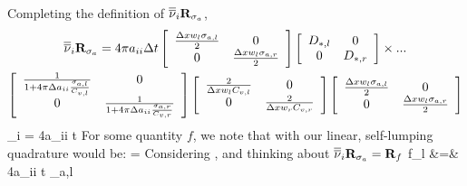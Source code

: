\eeanum
Completing the definition of $\overline{\overline{\nu}}_i \mathbf{R}_{\sigma_a}$,
\begin{multline}
\overline{\overline{\nu}}_i \mathbf{R}_{\sigma_a} = 4\pi a_{ii} \Delta t 
\left[  \begin{array}{cc} \frac{\Delta x w_l \sigma_{a,l} }{2}  & 0 \\ 0 & \frac{\Delta x w_l \sigma_{a,r} }{2}  \end{array} \right] 
\left[  \begin{array}{cc} D_{*,l} & 0 \\ 0 & D_{*,r} \end{array} \right] \times ... \\
\left[ \begin{array}{cc} \frac{1}{1 + 4\pi \Delta a_{ii} \frac{\sigma_{a,l}}{C_{v,l}}}& 0 \\ 0 &   \frac{1}{1 + 4\pi \Delta a_{ii} \frac{\sigma_{a,r}}{C_{v,r}}} \end{array} \right]
\left[ \begin{array}{cc} \frac{2}{\Delta x w_l C_{v,l} }& 0 \\ 0 & \frac{2}{\Delta x w_r C_{v,r} } \end{array} \right]
\left[  \begin{array}{cc} \frac{\Delta x w_l \sigma_{a,l} }{2}  & 0 \\ 0 & \frac{\Delta x w_l \sigma_{a,r} }{2}  \end{array} \right] 
\end{multline}
\benum
\overline{\overline{\nu}}_i  = 4\pi a_{ii} \Delta t 
\label{eq:almost_to_f}
\eenum
For some quantity $f$, we note that  with our linear, self-lumping quadrature would be:
\benum
{} =  \pep
\eenum
Considering , and thinking about $\overline{\overline{\nu}}_i \mathbf{R}_{\sigma_a} = \mathbf{R}_{f}$
\beanum
f_l &=& 4\pi a_{ii} \Delta t  \sigma_{a,l} \\
